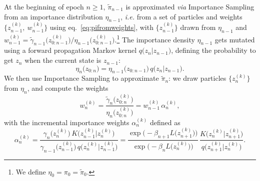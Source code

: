 \documentclass[11pt,a4paper]{article}
\begin{document}
	At the beginning of epoch $n\geq1$, $\tilde{\pi}_{n-1}$ is approximated \textit{via} Importance Sampling from an importance distribution $\eta_{n-1}$, \textit{i.e.} from a set of particles and weights $\big\{z_{n-1}^{(k)},\ w_{n-1}^{(k)}\big\}$ using eq.~\eqref{eq:pifromweights}, with $\big\{z_{n-1}^{(k)}\big\}$ drawn from $\eta_{n-1}$ and $w_{n-1}^{(k)} = \tilde{\gamma}_{n-1}\big(z_{0:n-1}^{(k)}\big)/\eta_{n-1}\big(z_{0:n-1}^{(k)}\big)$.\footnote{We define $\eta_{0} = \pi_{0} = \tilde{\pi}_{0}$.} The importance density $\eta_{n-1}$ gets mutated using a forward propagation Markov kernel $q\big(z_{n}\vert z_{n-1}\big)$, defining the probability to get $z_{n}$ when the current state is $z_{n-1}$:
	\begin{equation}
		\eta_{n}\big(z_{0:n}\big) = \eta_{n-1}\big(z_{0:n-1}\big)\,q\big(z_{n}\vert z_{n-1}\big).
	\end{equation}
	We then use Importance Sampling to approximate $\tilde{\pi}_{n}$: we draw particles $\big\{z^{(k)}_{n}\big\}$ from $\eta_{n}$, and compute the weights
	\begin{equation} \label{eq:weightsupdate}
		w_{n}^{(k)} = \frac{\tilde{\gamma}_{n}\big(z_{0:n}^{(k)}\big)}{\eta_{n}\big(z_{0:n}^{(k)}\big)} = w_{n-1}^{(k)}\,\alpha_{n}^{(k)},
	\end{equation}
	with the incremental importance weights $\alpha_{n}^{(k)}$ defined as
	\begin{equation}	\label{eq: incremental_importance}
			\alpha^{(k)}_{n} =  \frac{\gamma_{n}\big(z_{n}^{(k)}\big)\,K\big(z^{(k)}_{n-1}\vert z^{(k)}_{n}\big)}{\gamma_{n-1}\big(z_{n-1}^{(k)}\big)\,q\big(z^{(k)}_{n}\vert z^{(k)}_{n-1}\big)} = \frac{\exp\Big(-\beta_{n+1}L\big(z_{n+1}^{(k)}\big)\Big)}{\exp\Big(-\beta_{n}L\big(z_{n}^{(k)}\big)\Big)}\,\frac{K\big(z^{(k)}_{n}\vert z^{(k)}_{n+1}\big)}{q\big(z^{(k)}_{n+1}\vert z^{(k)}_{n}\big)}.
	\end{equation}
\end{document}
